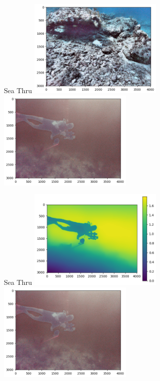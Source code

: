 \begin{frame}{Sea Thru}
  \centering
  \includegraphics[height=0.7\textheight,width=0.49\textwidth,keepaspectratio]{images/a3d-seathru.png}
  \includegraphics[height=0.7\textheight,width=0.49\textwidth,keepaspectratio]{images/a3d-diver-seathru.png}
\end{frame}

\begin{frame}{Sea Thru}
  \centering
  \includegraphics[height=0.7\textheight,width=0.49\textwidth,keepaspectratio]{images/a3d-diver-depth.png}
  \includegraphics[height=0.7\textheight,width=0.49\textwidth,keepaspectratio]{images/a3d-diver-seathru.png}
\end{frame}


